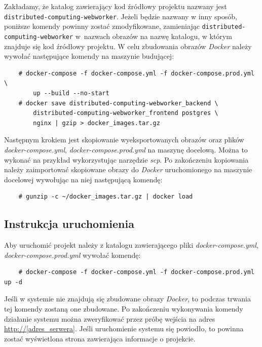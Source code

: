 \documentclass[a4paper,11pt,twoside]{report}
\theoremstyle{definition}
\begin{document}
        Zakładamy, że katalog zawierający kod źródłowy projektu nazwany jest \texttt{distributed-computing-webworker}. Jeżeli będzie nazwany w inny sposób, poniższe komendy powinny zostać zmodyfikowane, zamieniając \texttt{distributed-computing-webworker} w~nazwach obrazów na nazwę katalogu, w którym znajduje się kod źródłowy projektu. 
        W celu zbudowania obrazów \textit{Docker} należy wywołać następujące komendy na maszynie budującej:

        \begin{verbatim}
    # docker-compose -f docker-compose.yml -f docker-compose.prod.yml \
        up --build --no-start
    # docker save distributed-computing-webworker_backend \
        distributed-computing-webworker_frontend postgres \
        nginx | gzip > docker_images.tar.gz    
        \end{verbatim}

        Następnym krokiem jest skopiowanie wyeksportowanych obrazów oraz plików \textit{docker-compose.yml}, \textit{docker-compose.prod.yml} na maszynę docelową. Można to wykonać na przykład wykorzystując narzędzie \textit{scp}.
        Po zakończeniu kopiowania należy zaimportować skopiowane obrazy do \textit{Docker} uruchomionego na maszynie docelowej wywołując na niej następującą komendę:

        \begin{verbatim}
    # gunzip -c ~/docker_images.tar.gz | docker load
        \end{verbatim}

    \subsection{Instrukcja uruchomienia}
        \label{start-system}
        Aby uruchomić projekt należy z katalogu zawierającego pliki \textit{docker-compose.yml}, \textit{docker-compose.prod.yml} wywołać komendę:

        \begin{verbatim}
    # docker-compose -f docker-compose.yml -f docker-compose.prod.yml up -d
        \end{verbatim}

        Jeśli w systemie nie znajdują się zbudowane obrazy \textit{Docker}, to podczas trwania tej komendy zostaną one zbudowane.
        Po zakończeniu wykonywania komendy działanie systemu można zweryfikować przez próbę wejścia na adres \url{http://[adres_serwera]}. Jeśli uruchomienie systemu się powiodło, to powinna zostać wyświetlona strona zawierająca informacje o projekcie.
\end{document}

